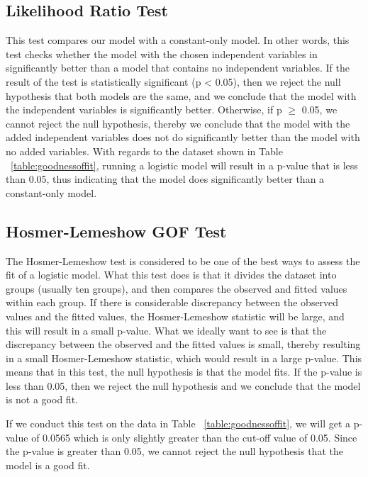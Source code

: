 \documentclass[a4paper,12pt,oneside]{book}
\begin{document}
\subsection{Likelihood Ratio Test}
This test compares our model with a constant-only model. In other words, this test checks whether the model with the chosen independent variables in significantly better than a model that contains no independent variables. 
If the result of the test is statistically significant (p < 0.05), then we reject the null hypothesis that both models are the same, and we conclude that the model with the independent variables is significantly better. 
Otherwise, if p $\geq$ 0.05, we cannot reject the null hypothesis, thereby we conclude that the model with the added independent variables does not do significantly better than the model with no added variables. With regards to 
the dataset shown in Table ~\ref{table:goodnessoffit}, running a logistic model will result in a p-value that is less than 0.05, thus indicating that the model does significantly better than a constant-only model. 
\subsection{Hosmer-Lemeshow GOF Test}
The Hosmer-Lemeshow test is considered to be one of the best ways to assess the fit of a logistic model. What this test does is that it divides the dataset into groups (usually ten groups), and then compares the 
observed and fitted values within each group. If there is considerable discrepancy between the observed values and the fitted values, the Hosmer-Lemeshow statistic will be large, and this will result in a small p-value. 
What we ideally want to see is that the discrepancy between the observed and the fitted values is small, thereby resulting in a small Hosmer-Lemeshow statistic, which would result in a large p-value. This means that in 
this test, the null hypothesis is that the model fits. If the p-value is less than 0.05, then we reject the null hypothesis and we conclude that the model is not a good fit. 

If we conduct this test on the data in Table ~\ref{table:goodnessoffit}, we will get a p-value of 0.0565 which is only slightly greater than the cut-off value of 0.05. Since the p-value is greater than 0.05, we cannot reject the null 
hypothesis that the model is a good fit.
\end{document}
